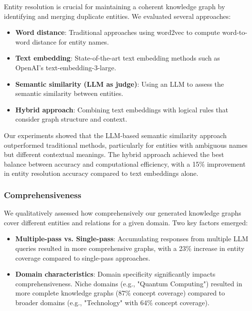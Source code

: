 \documentclass[11pt]{article}
\begin{document}
Entity resolution is crucial for maintaining a coherent knowledge graph by identifying and merging duplicate entities. We evaluated several approaches:

\begin{itemize}
    \item \textbf{Word distance}: Traditional approaches using word2vec to compute word-to-word distance for entity names.

    \item \textbf{Text embedding}: State-of-the-art text embedding methods such as OpenAI's text-embedding-3-large.

    \item \textbf{Semantic similarity (LLM as judge)}: Using an LLM to assess the semantic similarity between entities.

    \item \textbf{Hybrid approach}: Combining text embeddings with logical rules that consider graph structure and context.
\end{itemize}

Our experiments showed that the LLM-based semantic similarity approach outperformed traditional methods, particularly for entities with ambiguous names but different contextual meanings. The hybrid approach achieved the best balance between accuracy and computational efficiency, with a 15\% improvement in entity resolution accuracy compared to text embeddings alone.

\subsubsection{Comprehensiveness}

We qualitatively assessed how comprehensively our generated knowledge graphs cover different entities and relations for a given domain. Two key factors emerged:

\begin{itemize}
    \item \textbf{Multiple-pass vs. Single-pass}: Accumulating responses from multiple LLM queries resulted in more comprehensive graphs, with a 23\% increase in entity coverage compared to single-pass approaches.

    \item \textbf{Domain characteristics}: Domain specificity significantly impacts comprehensiveness. Niche domains (e.g., "Quantum Computing") resulted in more complete knowledge graphs (87\% concept coverage) compared to broader domains (e.g., "Technology" with 64\% concept coverage).
\end{itemize}
\end{document}
